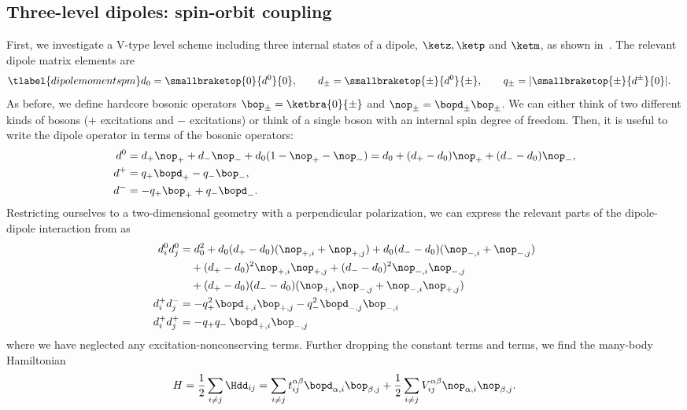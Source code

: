 \subsection{Three-level dipoles: spin-orbit coupling}
First, we investigate a \textsf{V}-type level scheme including three internal states of a dipole, $\ketz, \ketp$ and $\ketm$, as shown in~. The relevant dipole matrix elements are
\begin{align} \tlabel{dipolemomentspm}
    d_0 = \smallbraketop{0}{d^0}{0}, \qquad
    d_\pm = \smallbraketop{\pm}{d^0}{\pm}, \qquad
    q_\pm &= |\smallbraketop{\pm}{d^\pm}{0}|.
\end{align}
As before, we define hardcore bosonic operators $\bop_\pm=\ketbra{0}{{\pm}}$ and $\nop_{\pm}=\bopd_{\pm}\bop_{\pm}$. We can either think of two different kinds of bosons ($+$ excitations and $-$ excitations) or think of a single boson with an internal spin degree of freedom. Then, it is useful to write the dipole operator in terms of the bosonic operators:
\begin{align}
    d^0 &= d_+ \nop_+ + d_- \nop_- + d_0 (1-\nop_+-\nop_-) = d_0 + (d_+-d_0) \nop_+ + (d_--d_0) \nop_-, \\
    d^+ &= q_+ \bopd_+ - q_- \bop_-, \\
    d^- &= - q_+ \bop_+  + q_- \bopd_-.
\end{align}
Restricting ourselves to a two-dimensional geometry with a perpendicular polarization, we can express the relevant parts of the dipole-dipole interaction from  as
\begin{align}
    d^0_i d^0_j &= d_0^2 + d_0(d_+-d_0) (\nop_{+,i}+\nop_{+,j}) + d_0(d_--d_0) (\nop_{-,i}+\nop_{-,j}) \\
                &\quad + (d_+ - d_0)^2 \nop_{+,i} \nop_{+,j} + (d_- - d_0)^2 \nop_{-,i} \nop_{-,j} \\
                &\quad + (d_+ - d_0)(d_- - d_0) (\nop_{+,i} \nop_{-,j} + \nop_{-,i} \nop_{+,j}) \\
    d^+_i d^-_j &= - q_+^2 \bopd_{+,i} \bop_{+,j} - q_-^2 \bopd_{-,j} \bop_{-,i} \\
    d^+_i d^+_j &= - q_+q_- \, \bopd_{+,i} \bop_{-,j}
\end{align}
where we have neglected any excitation-nonconserving terms. Further dropping the constant terms and  terms, we find the many-body Hamiltonian
\begin{align}
    H = \frac{1}{2} \sum_{i\ne j} \Hdd_{ij} = \sum_{i\ne j}  t_{ij}^{\alpha\beta} \bopd_{\alpha,i} \bop_{\beta,j}
    +\frac{1}{2}\sum_{i\ne j} V_{ij}^{\alpha\beta} \nop_{\alpha,i} \nop_{\beta,j}.
\end{align}
